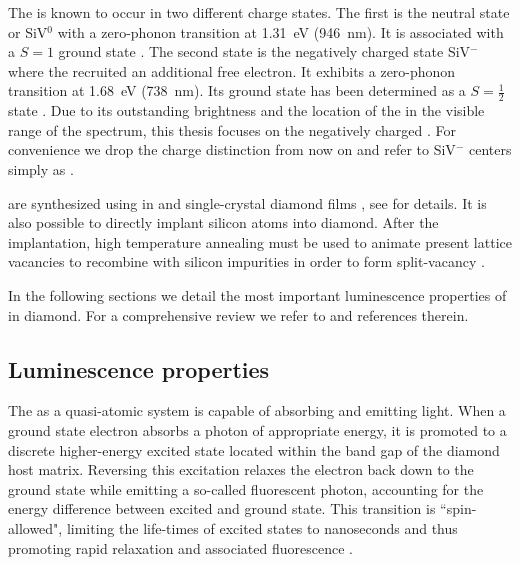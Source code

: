   The \siv is known to occur in two different charge states. The first is the neutral state or SiV$^0$ with a zero-phonon transition at \SI{1.31}{\eV} (\SI{946}{\nm}). It is associated with a $S = 1$ ground state \cite{DHaenens-Johansson2011}. The second state is the negatively charged state SiV$^{-}$ where the \sivc recruited an additional free electron. It exhibits a zero-phonon transition at \SI{1.68}{\eV} (\SI{738}{\nm}). Its ground state has been determined as a $S = \frac{1}{2}$ state \cite{Goss2007, Hepp2014}. Due to its outstanding brightness and the location of the \zpl in the visible range of the spectrum, this thesis focuses on the negatively charged \siv. For convenience we drop the charge distinction from now on and refer to SiV$^{-}$ centers simply as \sivs.

  \sivs are synthesized using \CVD in \nds and single-crystal diamond films \cite{Neu2011b}, see  for details. It is also possible to directly implant silicon atoms into diamond. After the implantation, high temperature annealing must be used to animate present lattice vacancies to recombine with silicon impurities in order to form split-vacancy \sivs \cite{Collins1983,Hepp2014}.

  In the following sections we detail the most important luminescence properties of \sivs in diamond. For a comprehensive review we refer to \cite{Riedrich-moller2014, Neu2012} and references therein.


  \subsection{Luminescence properties}

    The \sivc as a quasi-atomic system is capable of absorbing and emitting light. When a ground state electron absorbs a photon of appropriate energy, it is promoted to a discrete higher-energy excited state located within the band gap of the diamond host matrix. Reversing this excitation relaxes the electron back down to the ground state while emitting a so-called fluorescent photon, accounting for the energy difference between excited and ground state. This transition is ``spin-allowed", limiting the life-times of excited states to nanoseconds and thus promoting rapid relaxation and associated fluorescence \cite{Gali2013}.


